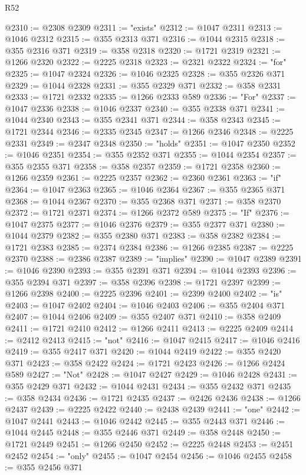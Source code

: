 \begin{lexlean}{R52}
\begin{coremodule}
@2310 := @2308 @2309
@2311 := "exists"
@2312 := @1047 @2311
@2313 := @1046 @2312
@2315 := @355 @2313 @371
@2316 := @1044 @2315
@2318 := @355 @2316 @371
@2319 := @358 @2318
@2320 := @1721 @2319
@2321 := @1266 @2320
@2322 := @2225 @2318
@2323 := @2321 @2322
@2324 := "for"
@2325 := @1047 @2324
@2326 := @1046 @2325
@2328 := @355 @2326 @371
@2329 := @1044 @2328
@2331 := @355 @2329 @371
@2332 := @358 @2331
@2333 := @1721 @2332
@2335 := @1266 @2333 @589
@2336 := "For"
@2337 := @1047 @2336
@2338 := @1046 @2337
@2340 := @355 @2338 @371
@2341 := @1044 @2340
@2343 := @355 @2341 @371
@2344 := @358 @2343
@2345 := @1721 @2344
@2346 := @2335 @2345
@2347 := @1266 @2346
@2348 := @2225 @2331
@2349 := @2347 @2348
@2350 := "holds"
@2351 := @1047 @2350
@2352 := @1046 @2351
@2354 := @355 @2352 @371
@2355 := @1044 @2354
@2357 := @355 @2355 @371
@2358 := @358 @2357
@2359 := @1721 @2358
@2360 := @1266 @2359
@2361 := @2225 @2357
@2362 := @2360 @2361
@2363 := "if"
@2364 := @1047 @2363
@2365 := @1046 @2364
@2367 := @355 @2365 @371
@2368 := @1044 @2367
@2370 := @355 @2368 @371
@2371 := @358 @2370
@2372 := @1721 @2371
@2374 := @1266 @2372 @589
@2375 := "If"
@2376 := @1047 @2375
@2377 := @1046 @2376
@2379 := @355 @2377 @371
@2380 := @1044 @2379
@2382 := @355 @2380 @371
@2383 := @358 @2382
@2384 := @1721 @2383
@2385 := @2374 @2384
@2386 := @1266 @2385
@2387 := @2225 @2370
@2388 := @2386 @2387
@2389 := "implies"
@2390 := @1047 @2389
@2391 := @1046 @2390
@2393 := @355 @2391 @371
@2394 := @1044 @2393
@2396 := @355 @2394 @371
@2397 := @358 @2396
@2398 := @1721 @2397
@2399 := @1266 @2398
@2400 := @2225 @2396
@2401 := @2399 @2400
@2402 := "is"
@2403 := @1047 @2402
@2404 := @1046 @2403
@2406 := @355 @2404 @371
@2407 := @1044 @2406
@2409 := @355 @2407 @371
@2410 := @358 @2409
@2411 := @1721 @2410
@2412 := @1266 @2411
@2413 := @2225 @2409
@2414 := @2412 @2413
@2415 := "not"
@2416 := @1047 @2415
@2417 := @1046 @2416
@2419 := @355 @2417 @371
@2420 := @1044 @2419
@2422 := @355 @2420 @371
@2423 := @358 @2422
@2424 := @1721 @2423
@2426 := @1266 @2424 @589
@2427 := "Not"
@2428 := @1047 @2427
@2429 := @1046 @2428
@2431 := @355 @2429 @371
@2432 := @1044 @2431
@2434 := @355 @2432 @371
@2435 := @358 @2434
@2436 := @1721 @2435
@2437 := @2426 @2436
@2438 := @1266 @2437
@2439 := @2225 @2422
@2440 := @2438 @2439
@2441 := "one"
@2442 := @1047 @2441
@2443 := @1046 @2442
@2445 := @355 @2443 @371
@2446 := @1044 @2445
@2448 := @355 @2446 @371
@2449 := @358 @2448
@2450 := @1721 @2449
@2451 := @1266 @2450
@2452 := @2225 @2448
@2453 := @2451 @2452
@2454 := "only"
@2455 := @1047 @2454
@2456 := @1046 @2455
@2458 := @355 @2456 @371

\end{coremodule}
\end{lexlean}
